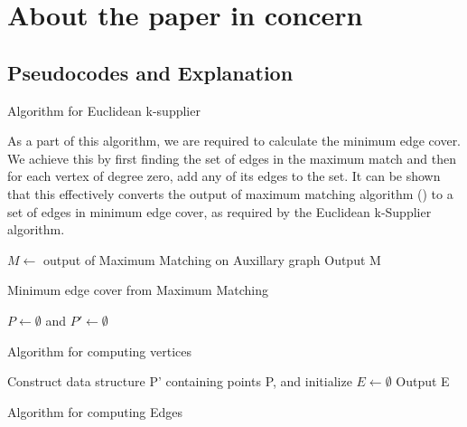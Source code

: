 \documentclass[12pt, a4paper]{article}
\begin{document}
\section{About the paper in concern}

\subsection{Pseudocodes and Explanation}
\begin{algorithm}[H]
 \caption{Algorithm for Euclidean k-supplier}
 \end{algorithm}

As a part of this algorithm, we are required to calculate the minimum edge cover. We achieve this by first finding the set of edges in the maximum match and then for each vertex of degree zero, add any of its edges to the set. It can be shown that this effectively converts the output of maximum matching algorithm (\cite{MicaliVazirani}) to a set of edges in minimum edge cover, as required by the Euclidean k-Supplier algorithm.\\

\begin{algorithm}[H]
$M \gets$ output of Maximum Matching on Auxillary graph\;
 Output M\;
 \caption{Minimum edge cover from Maximum Matching}
 \end{algorithm}
 
\begin{algorithm}[H]
 $P \gets \emptyset$ and $ P' \gets \emptyset$ \;
\caption{Algorithm for computing vertices}
\end{algorithm}

\begin{algorithm}[H]
 Construct data structure P' containing points P, and initialize $E \gets \emptyset$\;
 Output E\;
 \caption{Algorithm for computing Edges}
\end{algorithm}
\end{document}

